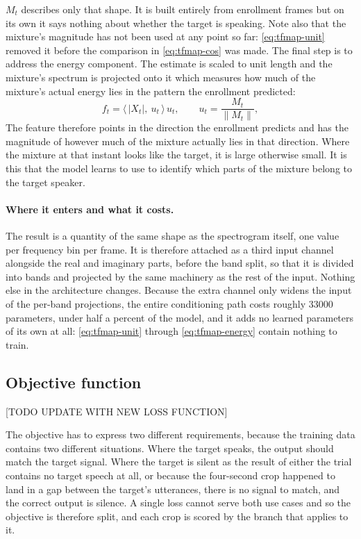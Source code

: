 $M_t$ describes only that shape. It is built entirely from enrollment frames but on its own it says nothing about whether the target is speaking. Note also that the mixture's magnitude has not been used at any point so far: \eqref{eq:tfmap-unit} removed it before the comparison in \eqref{eq:tfmap-cos} was made. The final step is to address the energy component. The estimate is scaled to unit length and the mixture's spectrum is projected onto it which measures how much of the mixture's actual energy lies in the pattern the enrollment predicted:
\begin{equation}
f_t = \big\langle\, |X_t|,\ u_t \,\big\rangle\, u_t,
\qquad
u_t = \frac{M_t}{\lVert M_t \rVert},
\label{eq:tfmap-energy}
\end{equation}
The feature therefore points in the direction the enrollment predicts and has the magnitude of however much of the mixture actually lies in that direction. Where the mixture at that instant looks like the target, it is large otherwise small. It is this that the model learns to use to identify which parts of the mixture belong to the target speaker.

\paragraph{Where it enters and what it costs.}
The result is a quantity of the same shape as the spectrogram itself, one value per frequency bin per frame. It is therefore attached as a third input channel alongside the real and imaginary parts, before the band split, so that it is divided into bands and projected by the same machinery as the rest of the input. Nothing else in the architecture changes. Because the extra channel only widens the input of the per-band projections, the entire conditioning path costs roughly \num{33000} parameters, under half a percent of the model, and it adds no learned parameters of its own at all: \eqref{eq:tfmap-unit} through \eqref{eq:tfmap-energy} contain nothing to train.






\subsection{Objective function} [TODO UPDATE WITH NEW LOSS FUNCTION]
\label{sec:objective}

The objective has to express two different requirements, because the training data contains two different situations. Where the target speaks, the output should match the target signal. Where the target is silent as the result of either the trial contains no target speech at all, or because the four-second crop happened to land in a gap between the target's utterances, there is no signal to match, and the correct output is silence. A single loss cannot serve both use cases and so the objective is therefore split, and each crop is scored by the branch that applies to it.

